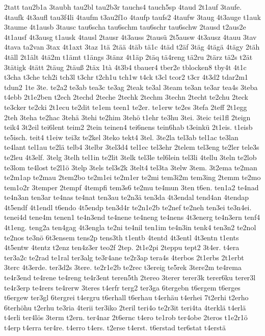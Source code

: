 {2tatt
tau2b1a
3taubh
tau2bl
tau2b3r
tauchs4
tauch5sp
4taud
2t1auf
3taufe.
4taufk
4t3aufl
tau3f4li
4taufm
t3au2f1o
4taufp
taufs2
4taufw
3taug
4t3auge
t1auk
3taume
4t1ausb
3tausc
tau6scha
tau6schm
tau6schr
tau6schw
2tausd
t2aus2e
4t1ausf
4t3ausg
t1ausk
4tausl
2tausr
4t3auss
2tausü
2t5ausw
4t3ausz
4tauu
3tav
4tava
ta2van
3tax
4t1axt
3taz
1tä
2tää
4täb
tä1c
4täd
t2äf
3täg
4tägä
4tägy
2täh
4täll
2t1ält
4tä2m
t1ämt
t1ängs
3tänz
4t1äp
2täq
tä4reng
tä2ru
2tärz
tä2s
t2ät
3tätigk
4tätt
2täug
2täuß
2täx
1tà
4t3b4
tbauer4
tber2e
tblocken8
tby4t
4t1c
t3cha
t3che
tch2i
tch3l
t3chr
t2ch1u
tch1w
t4ck
t3cl
tcor2
t3cr
4t3d2
tdar2m1
tdun2
1te
3te.
te2a2
te3ab
tea3c
te3ag
2teak
te3al
3team
te3an
te3ar
tea4s
3teba
t4ebb
2t1e2ben
t2ech
2techd
2teche
2techk
2techm
3techn
2techt
te2chu
2teck
te3cker
te2cki
2t1ecu
te2dit
te1em
teen1
te2er.
te1erw
te2es
3tefa
2teff
2t1egg
2teh
3teha
te2hac
3tehä
3tehi
te2him
3tehö
t1ehr
te3hu
3tei.
3teic
tei1fl
2teign
teik4
3t2eil
tei6lent
teim2
2tein
teinen4
tei6nens
tein6hab
t3einkü
2t1eis.
t1eisb
te5isch.
teit4
t1eiw
tei3z
te2kel
3teko
tekt4
3tel.
3te2la
tel3ab
tel1ac
te3lan
te4lant
tel1au
te2lä
telb4
3telbr
3tel3d4
tel1ec
tel3ehr
2telem
tel3eng
te2ler
tele3s
te2leu
4t3elf.
3telg
3telh
tel1in
te2lit
3telk
tel3le
tel6lein
tel3li
4tellu
3teln
te2lob
te3lom
te4lost
te2l1ö
3telp
3tels
tel3s2k
3telt4
tel3ta
3telw
3tem.
3t2ema
te2man
te2m1ap
te2mau
2tem2bo
te2m1ei
te2m1er
te2mi
tem3i2m
tem3ing
2temm
te2mo
tem1o2r
3temper
2tempf
4tempfi
tem3s6
te2mu
te4mun
3ten
t6en.
ten1a2
te4nad
te4n3an
ten3ar
te4nas
te4nat
ten3au
te2n3ä
ten3da
4t3endal
tend4an
4tendap
4t5endf
4t1endl
t6endo
4t5endp
ten3d4r
te2n1e2b
te2nef
te2neh
ten3ei
te3n4ei.
tenei4d
tene4m
tenen1
te4n3end
te4nene
te4neng
te4nens
4t3energ
te4n3ern
tenf4
4t1eng.
teng2a
ten4gag
4t3engla
te2ni
te4nil
ten1im
te4n3in
tenk4
ten3n2
te2nol
te2nos
te3nö
6t3ensem
tens2p
tens3th
t1entb
4tentd
4t3entl
4t3entn
t1ents
4t5entw
4tentz
t2enz
ten4z3er
teo2f
2tep.
2t1e2pi
2teppu
tept2
3t4er.
t4era
ter3a2c
te2rad
te1ral
ter3alg
te3r4ane
te2r3ap
tera4s
4terbos
2t1erbs
2t1erbt
3terc
4t3erde.
ter3d2s
3tere.
te2r1e2b
te2rec
t3ereig
te5rek
3tere2m
te4rema
te4r3end
te4rene
te4reng
te4r3ent
teren5th
2tereo
3terer
terer3k
terer6ku
terer3l
te4r3erp
te4rers
te4rerw
3teres
t4erfr
terg2
ter3ga
6tergebn
t6ergem
t6erges
t6ergew
ter3gl
6tergrei
t4ergru
t6erhall
t6erhau
t4erhäu
t4erhei
7t2erhi
t2erho
6terhöhu
t2erhu
te3ria
4terii
ter3iko
2teril
teri4o
te2r3it
teri4ta
4terklä
t4erlä
t4erli
ter4lös
3term
t2ern.
ter4nar
2t6ernc
t4ero
te1rob
ter4obe
2teros
t1e2r1ö
t4erp
t4erra
ter4re.
t4erro
t4ers.
t2erse
t4erst.
t6erstad
ter6stat
t4erstä
}
